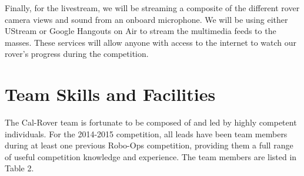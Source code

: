 \documentclass[titlepage,twocolumn,10pt]{article}
\begin{document}
    Finally, for the livestream, we will be streaming a composite of the different rover camera views and sound from an onboard microphone.  We will be using either UStream or Google Hangouts on Air to stream the multimedia feeds to the masses.  These services will allow anyone with access to the internet to watch our rover's progress during the competition.

    \section{Team Skills and Facilities}
    The Cal-Rover team is fortunate to be composed of and led by highly competent individuals. For the 2014-2015 competition, all leads have been team members during at least one previous Robo-Ops competition, providing them a full range of useful competition knowledge and experience.  The team members are listed in Table 2.
\end{document}
